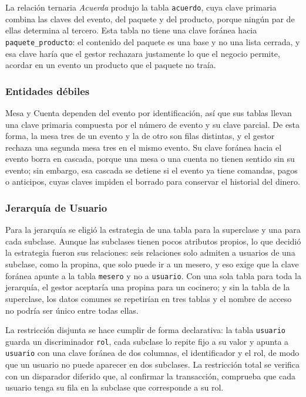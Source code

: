 La relación ternaria \textit{Acuerda} produjo la tabla \texttt{acuerdo}, cuya clave primaria combina las claves del evento, del paquete y del producto, porque ningún par de ellas determina al tercero. Esta tabla no tiene una clave foránea hacia \texttt{paquete\_producto}: el contenido del paquete es una base y no una lista cerrada, y esa clave haría que el gestor rechazara justamente lo que el negocio permite, acordar en un evento un producto que el paquete no traía.

\subsubsection{Entidades débiles}

Mesa y Cuenta dependen del evento por identificación, así que sus tablas llevan una clave primaria compuesta por el número de evento y su clave parcial. De esta forma, la mesa tres de un evento y la de otro son filas distintas, y el gestor rechaza una segunda mesa tres en el mismo evento. Su clave foránea hacia el evento borra en cascada, porque una mesa o una cuenta no tienen sentido sin su evento; sin embargo, esa cascada se detiene si el evento ya tiene comandas, pagos o anticipos, cuyas claves impiden el borrado para conservar el historial del dinero.

\subsubsection{Jerarquía de Usuario}

Para la jerarquía se eligió la estrategia de una tabla para la superclase y una para cada subclase. Aunque las subclases tienen pocos atributos propios, lo que decidió la estrategia fueron sus relaciones: seis relaciones solo admiten a usuarios de una subclase, como la propina, que solo puede ir a un mesero, y eso exige que la clave foránea apunte a la tabla \texttt{mesero} y no a \texttt{usuario}. Con una sola tabla para toda la jerarquía, el gestor aceptaría una propina para un cocinero; y sin la tabla de la superclase, los datos comunes se repetirían en tres tablas y el nombre de acceso no podría ser único entre todas ellas.

La restricción disjunta se hace cumplir de forma declarativa: la tabla \texttt{usuario} guarda un discriminador \texttt{rol}, cada subclase lo repite fijo a su valor y apunta a \texttt{usuario} con una clave foránea de dos columnas, el identificador y el rol, de modo que un usuario no puede aparecer en dos subclases. La restricción total se verifica con un disparador diferido que, al confirmar la transacción, comprueba que cada usuario tenga su fila en la subclase que corresponde a su rol.


